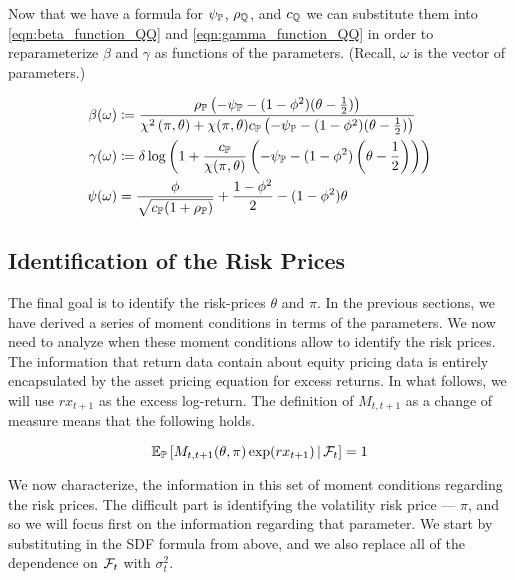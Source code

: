 \documentclass[11pt, letterpaper, twoside, final]{article}
\begin{document}
Now that we have a formula for $\psi_{\mathbb{P}}$, $\rho_{\mathbb{Q}}$, and $c_{\mathbb{Q}}$ we can substitute them into
\cref{eqn:beta_function_QQ}  and \cref{eqn:gamma_function_QQ} in order to reparameterize $\beta$ and $\gamma$ as
functions of the parameters.
(Recall, $\omega$ is the vector of parameters.)

\begin{align}
    \label{eqn:beta_function}
    \beta(\omega) &\coloneqq \frac{\rho_{\PP} \left(-\psi_{\PP} - (1- \phi^2)(\theta -
    \frac{1}{2})\right)}{\chi^2\left(\pi, \theta\right) + \chi(\pi, \theta)c_{\PP} \left(-\psi_{\PP} - (1-
    \phi^2)(\theta-\frac{1}{2} )\right)}  \\
%
    \label{eqn:gamma_function}
    \gamma(\omega) &\coloneqq \delta \log\left(1 + \frac{c_{\PP}}{\chi(\pi,\theta)} \left(-\psi_{\PP} - (1-
    \phi^2)\left(\theta - \frac{1}{2}\right) \right)\right) \\
%
    \label{eqn:psi_function}
    \psi(\omega) &= \frac{\phi}{\sqrt{c_{\PP} (1 + \rho_{\PP})}} + \frac{1 - \phi^2}{2} - (1 - \phi^2) \theta 
\end{align}


\subsection{Identification of the Risk Prices}

The final goal is to identify the risk-prices $\theta$ and $\pi$.
In the previous sections, we have derived a series of moment conditions in terms of the parameters.
We now need to analyze when these moment conditions allow to identify the risk prices. 
The information that return data contain about equity pricing data is entirely encapsulated by the asset pricing
equation for excess returns.  
In what follows, we will use $rx_{t+1}$ as the excess log-return.
The definition of $M_{t,t+1}$ as a change of measure means that the following holds.

\begin{equation}
    \operatorname{\mathbb{E}}_{\mathbb{P}}\left[ M_{t,t+1}(\theta, \pi) \exp(rx_{t+1}) \,\middle\vert\, \mathcal{F}_{t} \right] = 1
\end{equation}

We now characterize, the information in this set of moment conditions regarding the risk prices.
The difficult part is identifying the volatility risk price --- $\pi$, and so we will focus first on the
information regarding that parameter.
We start by substituting in the SDF formula from above, and we also replace all of the dependence on $\mathcal{F}_t$ with
$\sigma^2_t$.
\end{document}
